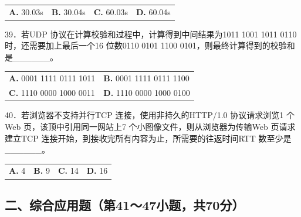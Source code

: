\documentclass[UTF8,11pt]{ctexart}
\begin{document}
\begin{center}\begin{tabular}{>{\raggedright\arraybackslash}p{\dimexpr(\linewidth-8\tabcolsep)/4\relax}>{\raggedright\arraybackslash}p{\dimexpr(\linewidth-8\tabcolsep)/4\relax}>{\raggedright\arraybackslash}p{\dimexpr(\linewidth-8\tabcolsep)/4\relax}>{\raggedright\arraybackslash}p{\dimexpr(\linewidth-8\tabcolsep)/4\relax}}
\textbf{A.} 30.\allowbreak{}03s & \textbf{B.} 30.\allowbreak{}04s & \textbf{C.} 60.\allowbreak{}03s & \textbf{D.} 60.\allowbreak{}04s\\[.35em]\end{tabular}\end{center}

39．若UDP 协议在计算校验和过程中，计算得到中间结果为1011 1001 1011 0110 时，还需要加上最后一个16 位数0110 0101 1100 0101，则最终计算得到的校验和是\_\_\_\_\_\_。


\begin{center}\begin{tabular}{>{\raggedright\arraybackslash}p{\dimexpr(\linewidth-4\tabcolsep)/2\relax}>{\raggedright\arraybackslash}p{\dimexpr(\linewidth-4\tabcolsep)/2\relax}}
\textbf{A.} 0001 1111 0111 1011 & \textbf{B.} 0001 1111 0111 1100\\[.35em]
\textbf{C.} 1110 0000 1000 0011 & \textbf{D.} 1110 0000 1000 0100\\[.35em]\end{tabular}\end{center}

40．若浏览器不支持并行TCP 连接，使用非持久的HTTP/1.0 协议请求浏览1 个Web 页，该顶中引用同一网站上7 个小图像文件，则从浏览器为传输Web 页请求建立TCP 连接开始，到接收完所有内容为止，所需要的往返时间RTT 数至少是\_\_\_\_\_\_。


\begin{center}\begin{tabular}{>{\raggedright\arraybackslash}p{\dimexpr(\linewidth-8\tabcolsep)/4\relax}>{\raggedright\arraybackslash}p{\dimexpr(\linewidth-8\tabcolsep)/4\relax}>{\raggedright\arraybackslash}p{\dimexpr(\linewidth-8\tabcolsep)/4\relax}>{\raggedright\arraybackslash}p{\dimexpr(\linewidth-8\tabcolsep)/4\relax}}
\textbf{A.} 4 & \textbf{B.} 9 & \textbf{C.} 14 & \textbf{D.} 16\\[.35em]\end{tabular}\end{center}

\subsection*{二、综合应用题（第41～47小题，共70分）}
\end{document}
